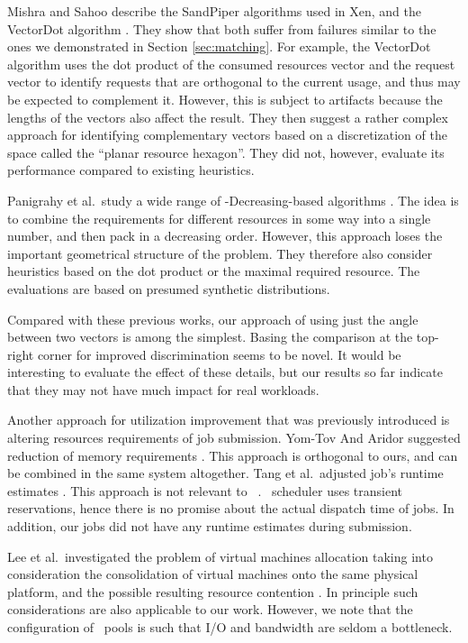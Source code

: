 Mishra and Sahoo \cite{mishra11} describe the SandPiper algorithms
used in Xen, and the VectorDot algorithm \cite{singh08}.
They show that both suffer from failures similar to the ones we
demonstrated in Section \ref{sec:matching}.
For example, the VectorDot algorithm uses the dot product of the
consumed resources vector and the request vector to identify requests
that are orthogonal to the current usage, and thus may be expected to
complement it.
However, this is subject to artifacts because the lengths of the
vectors also affect the result.
They then suggest a rather complex approach for identifying
complementary vectors based on a discretization of the space called
the ``planar resource hexagon''.
They did not, however, evaluate its performance compared to existing
heuristics.

Panigrahy et al.\ study a wide range of \fif-Decreasing-based
algorithms \cite{panigrahy11}.
The idea is to combine the requirements for different resources in
some way into a single number, and then pack in a decreasing order.
However, this approach loses the important geometrical structure of
the problem.
They therefore also consider heuristics based on the dot product or
the maximal required resource.
The evaluations are based on presumed synthetic distributions.

Compared with these previous works, our approach of using just the
angle between two vectors is among the simplest.
Basing the comparison at the top-right corner for improved
discrimination seems to be novel.
It would be interesting to evaluate the effect of these details, but
our results so far indicate that they may not have much impact for
real workloads.

Another approach for utilization improvement that was previously introduced 
is altering resources requirements of job submission. 
Yom-Tov And Aridor suggested reduction of memory requirements \cite{yomtov2008}. 
This approach is orthogonal to ours, and can be combined in the same system altogether.
Tang et al.\ adjusted job's runtime estimates \cite{Tang2010}. 
This approach is not relevant to \nb\ . 
\nb\ scheduler uses transient reservations, hence there is no promise about the actual dispatch 
time of jobs. In addition, our jobs did not have any runtime estimates during submission.

Lee et al.\ investigated the problem of virtual machines allocation
taking into consideration the consolidation of virtual machines onto
the same physical platform, and the possible resulting resource
contention \cite{sangmin}.
In principle such considerations are also applicable to our work.
However, we note that the configuration of \nb\ pools is such that I/O
and bandwidth are seldom a bottleneck.

